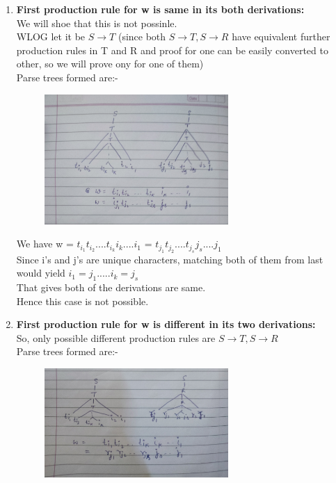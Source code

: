 \documentclass{article}
\begin{document}
\begin{enumerate}
    \item \textbf{First production rule for w is same in its both derivations: }\\
    We will shoe that this is not possinle.\\
    WLOG let it be $S \rightarrow T$ (since both $S \rightarrow T , S \rightarrow R$ have equivalent further production rules in T and R and proof for one can be 
    easily converted to other, so we will prove ony for one of them) \\

    Parse trees formed are:- \\  

    \begin{figure}[H]
        \centering
        \includegraphics[width=7cm]{1.jpg}
    \end{figure}

    We have w = $t_{i_1}t_{i_2}....t_{i_k}i_k....i_1$ = $t_{j_1}t_{j_2}....t_{j_s}j_s....j_1$\\
    Since i's and j's are unique characters, matching both of them from last would yield $i_1 = j_1 ..... i_k = j_s$\\
    That gives both of the derivations are same. \\
    Hence this case is not possible.\\

    \item \textbf{First production rule for w is different in its two derivations:}\\
    So, only possible different production rules are $S \rightarrow T, S \rightarrow R$\\
    Parse trees formed are:- \\  
    
    \begin{figure}[H]
        \centering
        \includegraphics[width=7cm]{2.jpg}
    \end{figure}


\end{enumerate}
\end{document}
